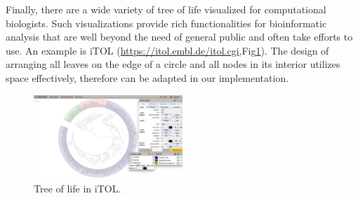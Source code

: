 \documentclass[11pt, a4paper,oneside,chapterprefix=false]{scrbook}
\begin{document}
Finally, there are a wide variety of tree of life visualized for computational biologists. Such visualizations provide rich functionalities for bioinformatic analysis that are well beyond the need of general public and often take efforts to use. An example is iTOL (\url{https://itol.embl.de/itol.cgi},Fig\ref{fig:iTOL}). The design of arranging all leaves on the edge of a circle and all nodes in its interior utilizes space effectively, therefore can be adapted in our implementation. 

\begin{figure}[h]
	\centering
	\includegraphics[width=0.5\textwidth]{figures/related_work/iTOL}
	\caption{Tree of life in iTOL. }
	\label{fig:iTOL}
\end{figure}
\end{document}
